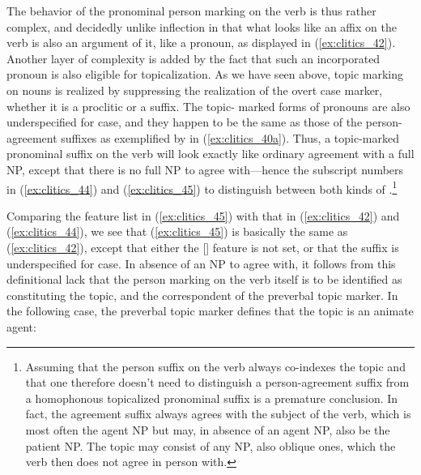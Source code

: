The behavior of the pronominal person marking on the verb is thus rather
complex, and decidedly unlike inflection in that what looks like an affix on
the verb is also an argument of it, like a pronoun, as displayed in
(\ref{ex:clitics_42}). Another layer of complexity is added by the fact that
such an incorporated pronoun is also eligible for topicalization. As we have
seen above, topic marking on nouns is realized by suppressing the realization
of the overt case marker, whether it is a proclitic or a suffix. The topic-
marked forms of pronouns are also underspecified for case, and they happen to
be the same as those of the person-agreement suffixes as exemplified by
 in (\ref{ex:clitics_40a}). Thus, a topic-marked pronominal
suffix on the verb will look exactly like ordinary agreement with a full NP,
except that there is no full NP to agree with---hence the subscript numbers in
(\ref{ex:clitics_44}) and (\ref{ex:clitics_45}) to distinguish between both
kinds of .\footnote{Assuming that the person suffix on the verb
always co-indexes the topic and that one therefore doesn't need to distinguish
a person-agreement suffix from a homophonous topicalized pronominal suffix is a
premature conclusion. In fact, the agreement suffix always agrees with the
subject of the verb, which is most often the agent NP but may, in absence of an
agent NP, also be the patient NP. The topic may consist of any NP, also oblique
ones, which the verb then does not agree in person with.}

\ex\label{ex:clitics_45}
\xe

Comparing the feature list in (\ref{ex:clitics_45}) with that in 
(\ref{ex:clitics_42}) and (\ref{ex:clitics_44}), we see that 
(\ref{ex:clitics_45}) is basically the same as (\ref{ex:clitics_42}), except
that either the [\Case{}] feature is not set, or that the suffix is
underspecified for case. In absence of an NP to agree with, it follows from this definitional lack that the person marking on the verb itself is to be identified as constituting the topic, and the correspondent of the preverbal topic marker. In the following case, the preverbal topic marker defines that the topic is an animate agent:

